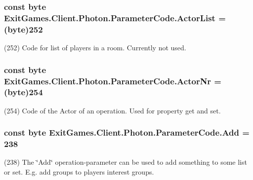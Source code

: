 \subsubsection[{\texorpdfstring{Actor\+List}{ActorList}}]{\setlength{\rightskip}{0pt plus 5cm}const byte Exit\+Games.\+Client.\+Photon.\+Parameter\+Code.\+Actor\+List = (byte)252}\hypertarget{class_exit_games_1_1_client_1_1_photon_1_1_parameter_code_a30b1064fb0e5cb00925779c51b7be59f}{}\label{class_exit_games_1_1_client_1_1_photon_1_1_parameter_code_a30b1064fb0e5cb00925779c51b7be59f}


(252) Code for list of players in a room. Currently not used.

\subsubsection[{\texorpdfstring{Actor\+Nr}{ActorNr}}]{\setlength{\rightskip}{0pt plus 5cm}const byte Exit\+Games.\+Client.\+Photon.\+Parameter\+Code.\+Actor\+Nr = (byte)254}\hypertarget{class_exit_games_1_1_client_1_1_photon_1_1_parameter_code_a54da07a3fc0088b2b6a6dac914f7a75f}{}\label{class_exit_games_1_1_client_1_1_photon_1_1_parameter_code_a54da07a3fc0088b2b6a6dac914f7a75f}


(254) Code of the Actor of an operation. Used for property get and set.

\subsubsection[{\texorpdfstring{Add}{Add}}]{\setlength{\rightskip}{0pt plus 5cm}const byte Exit\+Games.\+Client.\+Photon.\+Parameter\+Code.\+Add = 238}\hypertarget{class_exit_games_1_1_client_1_1_photon_1_1_parameter_code_a413bb55ac84cebf0dd90e85640e14746}{}\label{class_exit_games_1_1_client_1_1_photon_1_1_parameter_code_a413bb55ac84cebf0dd90e85640e14746}


(238) The \char`\"{}\+Add\char`\"{} operation-\/parameter can be used to add something to some list or set. E.\+g. add groups to player\textquotesingle{}s interest groups.

